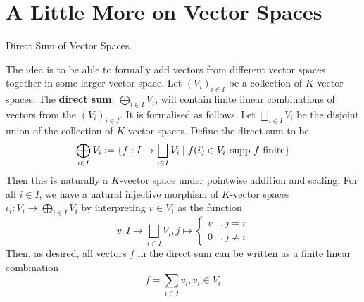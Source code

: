 \documentclass[../book.tex]{subfiles}
\begin{document}
\section{A Little More on Vector Spaces}

\begin{dfn} Direct Sum of Vector Spaces.
    
    The idea is to be able to formally add vectors from different vector spaces
    together in some larger vector space.
    Let $(V_i)_{i\in I}$ be a collection of $K$-vector spaces.
    The \textbf{direct sum}, $\bigoplus_{i\in I}V_i$, 
    will contain finite linear combinations of vectors from the $(V_i)_{i\in I}$.
    It is formalised as follows. 
    Let $\bigsqcup_{i\in I} V_i$ be the disjoint union 
    of the collection of $K$-vector spaces.
    Define the direct sum to be \[
        \bigoplus_{i\in I} V_i := \{f : I \to \bigsqcup_{i\in I} V_i \mid 
        f(i) \in V_i, \text{supp } f \text{ finite}\}
    \]
    Then this is naturally a $K$-vector space under pointwise addition and scaling.
    For all $i \in I$, we have a natural injective morphism of $K$-vector spaces 
    $\iota_i : V_i \to \bigoplus_{i\in I} V_i$ by interpreting
    $v \in V_i$ as the function \[
        v : I \to \bigsqcup_{i\in I} V_i, j \mapsto \begin{cases}
            v   &, j = i\\
            
            0   &, j \neq i
        \end{cases}
    \]
    Then, as desired, all vectors $f$ in the direct sum can be written as
    a finite linear combination \[
        f = \sum_{i \in I} v_i , v_i \in V_i
    \]
\end{dfn}
\end{document}
